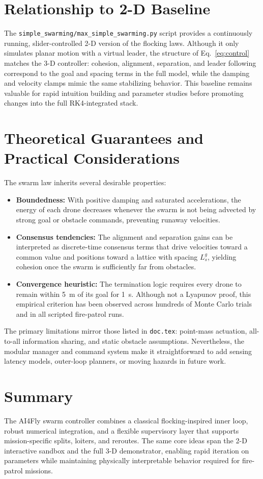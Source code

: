 \documentclass[conference]{AIAA}
\begin{document}
\section{Relationship to 2-D Baseline}
The \texttt{simple\_swarming/max\_simple\_swarming.py} script provides a continuously running, slider-controlled 2-D version of the flocking laws.  Although it only simulates planar motion with a virtual leader, the structure of Eq.~\eqref{eq:control} matches the 3-D controller: cohesion, alignment, separation, and leader following correspond to the goal and spacing terms in the full model, while the damping and velocity clamps mimic the same stabilizing behavior.  This baseline remains valuable for rapid intuition building and parameter studies before promoting changes into the full RK4-integrated stack.

\section{Theoretical Guarantees and Practical Considerations}
The swarm law inherits several desirable properties:
\begin{itemize}
	\item \textbf{Boundedness:} With positive damping and saturated accelerations, the energy of each drone decreases whenever the swarm is not being advected by strong goal or obstacle commands, preventing runaway velocities.
	\item \textbf{Consensus tendencies:} The alignment and separation gains can be interpreted as discrete-time consensus terms that drive velocities toward a common value and positions toward a lattice with spacing \(L_s^g\), yielding cohesion once the swarm is sufficiently far from obstacles.
	\item \textbf{Convergence heuristic:} The termination logic requires every drone to remain within \SI{5}{m} of its goal for \SI{1}{s}.  Although not a Lyapunov proof, this empirical criterion has been observed across hundreds of Monte Carlo trials and in all scripted fire-patrol runs.
\end{itemize}
The primary limitations mirror those listed in \texttt{doc.tex}: point-mass actuation, all-to-all information sharing, and static obstacle assumptions.  Nevertheless, the modular manager and command system make it straightforward to add sensing latency models, outer-loop planners, or moving hazards in future work.

\section{Summary}
The AI4Fly swarm controller combines a classical flocking-inspired inner loop, robust numerical integration, and a flexible supervisory layer that supports mission-specific splits, loiters, and reroutes.  The same core ideas span the 2-D interactive sandbox and the full 3-D demonstrator, enabling rapid iteration on parameters while maintaining physically interpretable behavior required for fire-patrol missions.
\end{document}
